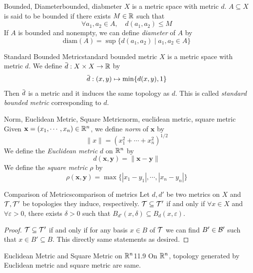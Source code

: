 \documentclass[12pt, a4paper, twoside]{article}
\newcommand{\overbar}[1]{\mkern 1.5mu\overline{\mkern-1.5mu#1\mkern-1.5mu}\mkern 1.5mu}
\newcommand{\norm}[1]{\|{#1}\|}
\theoremstyle{plain}
\begin{document}
\begin{defn}{Bounded, Diameter}{bounded, diabmeter}
    $X$ is a metric space with metric $d$. $A \subseteq X$ is said to be bounded if 
    there exists $M \in {\mathbb {R}}$ such that 
    \[\forall a_1, a_2 \in A, \quad d(a_1, a_2) \leq M\]
    If $A$ is bounded and nonempty, we can define \textit{diameter} of $A$ by 
    \[\text{diam}(A) = \sup \{d(a_1, a_2) \mid a_1, a_2 \in A\}\]
\end{defn}

\begin{thm}{Standard Bounded Metric}{standard bounded metric}
    $X$ is a metric space with metric $d$. We define $\overbar{d}: X \times X \rightarrow \BR$ by 
    \[\overbar{d} : (x, y) \mapsto \min \{d(x, y), 1\}\]
    Then $\overbar{d}$ is a metric and it induces the same topology as $d$. This is called \textit{standard bounded metric} corresponding to $d$. 
\end{thm}

\begin{defn}{Norm, Euclidean Metric, Square Metric}{norm, euclidean metric, square metric}
    Given $\mathbf{x} = (x_1, \cdots, x_n) \in {\mathbb {R}}^n$, we define \textit{norm} of $\mathbf{x}$ by 
    \[\norm{x} = (x_1^2 + \cdots + x_n^2)^{1/2}\]
    We define the \textit{Euclidean metric} $d$ on ${\mathbb {R}}^n$ by 
    \[d(\mathbf{x}, \mathbf{y}) = \norm{\mathbf{x} - \mathbf{y}}\]
    We define the \textit{square metric} $\rho$ by 
    \[\rho(\mathbf{x}, \mathbf{y}) = \max \{|x_1 - y_1|, \cdots, |x_n - y_n|\}\]
\end{defn}

\begin{lem}{Comparison of Metrics}{comparison of metrics}
    Let $d, d'$ be two metrics on $X$ and ${\mathcal {T}}, {\mathcal {T}}'$ be topologies they induce, respectively. 
    ${\mathcal {T}} \subseteq {\mathcal {T}}'$ if and only if $\forall x \in X$ and $\forall \varepsilon > 0$, there exists $\delta > 0$ such that $B_{d'}(x, \delta) \subseteq B_d(x, \varepsilon)$.  
\end{lem}

\begin{proof}
    ${\mathcal {T}} \subseteq {\mathcal {T}}'$ if and only if for any basis $x \in B$ of ${\mathcal {T}}$ we can find $B' \in {\mathcal {B}}'$ such that $x \in B' \subseteq B$. 
    This directly same statements as desired. 
\end{proof}

\begin{cor}{Euclidean Metric and Square Metric on ${\mathbb {R}}^n$}{11.9}
    On ${\mathbb {R}}^n$, topology generated by Euclidean metric and square metric are same. 
\end{cor}
\end{document}
